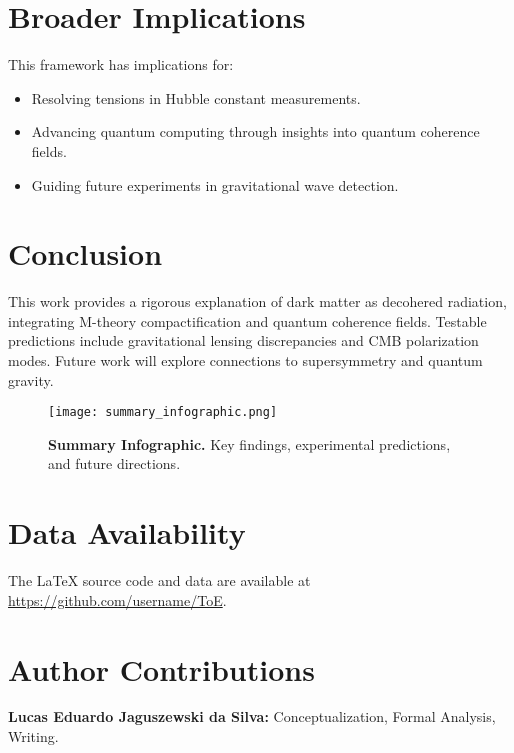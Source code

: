 \documentclass[12pt, a4paper]{article}
\begin{document}
\section*{Broader Implications}

This framework has implications for:
\begin{itemize}
\item Resolving tensions in Hubble constant measurements.
\item Advancing quantum computing through insights into quantum coherence fields.
\item Guiding future experiments in gravitational wave detection.
\end{itemize}

\section*{Conclusion}

This work provides a rigorous explanation of dark matter as decohered radiation, integrating M-theory compactification and quantum coherence fields. Testable predictions include gravitational lensing discrepancies and CMB polarization modes. Future work will explore connections to supersymmetry and quantum gravity.

\begin{figure}[h]
\centering
\texttt{[image: summary\_infographic.png]}
\caption{\textbf{Summary Infographic.} Key findings, experimental predictions, and future directions.}
\label{fig:summary}
\end{figure}

\section*{Data Availability}
The LaTeX source code and data are available at \url{https://github.com/username/ToE}.

\section*{Author Contributions}
\textbf{Lucas Eduardo Jaguszewski da Silva:} Conceptualization, Formal Analysis, Writing.



\end{document}
